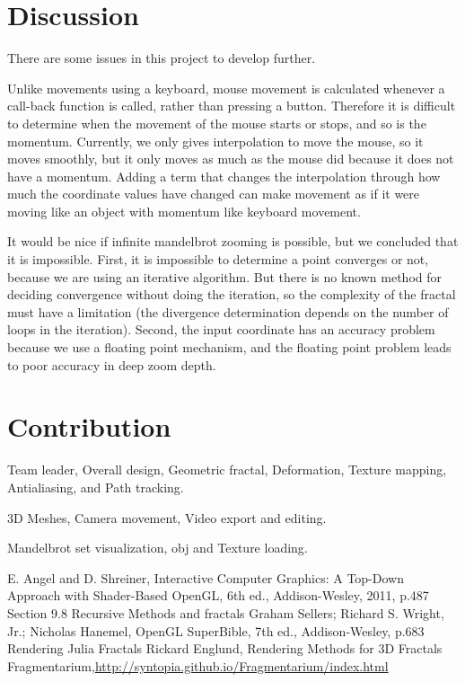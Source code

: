 \documentclass[a4paper]{article}
\begin{document}
\section{Discussion}
There are some issues in this project to develop further.
\begin{description}[style=nextline]
\item[Smooth Camera Movement]
Unlike movements using a keyboard, mouse movement is calculated whenever a call-back function is called, rather than pressing a button.
Therefore it is difficult to determine when the movement of the mouse starts or stops, and so is the momentum.
Currently, we only gives interpolation to move the mouse, so it moves smoothly, but it only moves as much as the mouse did because it does not have a momentum.
Adding a term that changes the interpolation through how much the coordinate values have changed can make movement as if it were moving like an object with momentum like keyboard movement.
\item[Infinite Mandelbrot zoom]
It would be nice if infinite mandelbrot zooming is possible, but we concluded that it is impossible. 
First, it is impossible to determine a point converges or not, because we are using an iterative algorithm. 
But there is no known method for deciding convergence without doing the iteration, so the complexity of the fractal must have a limitation (the divergence determination depends on the number of loops in the iteration). 
Second, the input coordinate has an accuracy problem because we use a floating point mechanism, and the floating point problem leads to poor accuracy in deep zoom depth. 
\end{description}

\section{Contribution}
\begin{description}[style=nextline]
\item[Yang Junha]
Team leader, Overall design, Geometric fractal, Deformation, Texture mapping, Antialiasing, and Path tracking.
\item[Ryu Sangwoo]
3D Meshes, Camera movement, Video export and editing.
\item[Sung Haebin]
Mandelbrot set visualization, obj and Texture loading.
\end{description}

\begin{thebibliography}{1}
E. Angel and D. Shreiner, Interactive Computer Graphics: A Top-Down Approach with Shader-Based OpenGL, 6th ed., Addison-Wesley, 2011, p.487 Section 9.8 Recursive Methods and fractals
Graham Sellers; Richard S. Wright, Jr.; Nicholas Hanemel, OpenGL SuperBible, 7th ed., Addison-Wesley, p.683 Rendering Julia Fractals
Rickard Englund, Rendering Methods for 3D Fractals
Fragmentarium,\url{http://syntopia.github.io/Fragmentarium/index.html}
\end{thebibliography}
\end{document}
